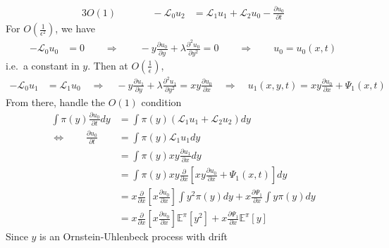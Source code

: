 \documentclass[12pt]{article}
\theoremstyle{plain}
\theoremstyle{definition}
\theoremstyle{remark}
\begin{document}
\begin{enumerate}
\begin{enumerate}
\begin{alignat*}{3}
          O(1) && \qquad -\mathscr{L}_0u_2 &=
          \mathscr{L}_1u_1 + \mathscr{L}_2u_0
          - \frac{\partial u_0}{\partial t}
        \end{alignat*}
        For $O\left(\frac{1}{\epsilon^2}\right)$, we have
        \begin{align*}
          -\mathscr{L}_0u_0 &= 0
          \qquad\Rightarrow\qquad
          -y \frac{\partial u_0}{\partial y}
          + \lambda\frac{\partial^2 u_0}{\partial y^2}
          = 0
          \qquad\Rightarrow\qquad
          u_0=u_0(x,t)
        \end{align*}
        i.e.\ a constant in $y$. Then at
        $O\left(\frac{1}{\epsilon}\right)$,
        \begin{align*}
          -\mathscr{L}_0u_1 &= \mathscr{L}_1u_0
          \quad\Rightarrow\quad
          -y \frac{\partial u_1}{\partial y}
          + \lambda\frac{\partial^2 u_1}{\partial y^2}
          = xy \frac{\partial u_0}{\partial x}
          \quad\Rightarrow\quad
          u_1(x,y,t) = {xy} \frac{\partial u_0}{\partial x}
          +\Psi_1(x,t)
        \end{align*}
        From there, handle the $O(1)$ condition
        \begin{align*}
          \int \pi(y) \frac{\partial u_0}{\partial t} dy
          &=
          \int \pi(y)
          \left(
          \mathscr{L}_1u_1 + \mathscr{L}_2u_2
          \right) dy\\
          \Leftrightarrow\qquad
          \frac{\partial u_0}{\partial t}
          &=
          \int \pi(y) \mathscr{L}_1u_1 dy\\
          &=
          \int \pi(y) xy \frac{\partial u_1}{\partial x} dy\\
          &=
          \int \pi(y) xy \frac{\partial }{\partial x}
          \left[
          {xy} \frac{\partial u_0}{\partial x}
          +\Psi_1(x,t)
          \right]dy\\
          &=
           x\frac{\partial }{\partial x}
          \left[ x\frac{\partial u_0}{\partial x} \right]
           \int y^2\pi(y) dy
          + x\frac{\partial \Psi_1}{\partial x}
          \int  y\pi(y) dy\\
          &=
           x\frac{\partial }{\partial x}
          \left[ x\frac{\partial u_0}{\partial x} \right]
          \mathbb{E}^\pi[y^2]
          + x\frac{\partial \Psi_1}{\partial x}
          \mathbb{E}^\pi[y]
        \end{align*}
        Since $y$ is an Ornstein-Uhlenbeck process with drift

\end{enumerate}
\end{enumerate}
\end{document}
